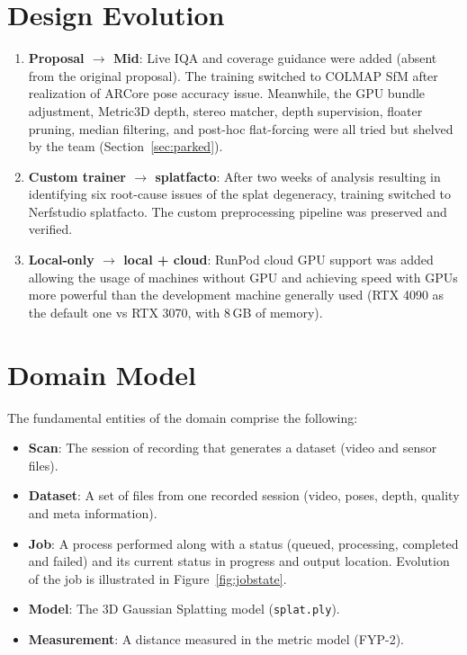 \section{Design Evolution}
\begin{enumerate}
    \item \textbf{Proposal $\rightarrow$ Mid}: Live IQA and coverage guidance were added (absent from the original proposal). The training switched to COLMAP SfM after realization of ARCore pose accuracy issue. Meanwhile, the GPU bundle adjustment, Metric3D depth, stereo matcher, depth supervision, floater pruning, median filtering, and post-hoc flat-forcing were all tried but shelved by the team (Section~\ref{sec:parked}).

    \item \textbf{Custom trainer $\rightarrow$ splatfacto}: After two weeks of analysis resulting in identifying six root-cause issues of the splat degeneracy, training switched to Nerfstudio splatfacto. The custom preprocessing pipeline was preserved and verified.

    \item \textbf{Local-only $\rightarrow$ local + cloud}: RunPod cloud GPU support was added allowing the usage of machines without GPU and achieving speed with GPUs more powerful than the development machine generally used (RTX 4090 as the default one vs RTX 3070, with 8\,GB of memory).
\end{enumerate}

\section{Domain Model}
\label{sec:domain}
The fundamental entities of the domain comprise the following:
\begin{itemize}
    \item \textbf{Scan}: The session of recording that generates a dataset (video and sensor files).
    \item \textbf{Dataset}: A set of files from one recorded session (video, poses, depth, quality and meta information).
    \item \textbf{Job}: A process performed along with a status (queued, processing, completed and failed) and its current status in progress and output location. Evolution of the job is illustrated in Figure~\ref{fig:jobstate}.
    \item \textbf{Model}:  The 3D Gaussian Splatting model (\texttt{splat.ply}).
    \item \textbf{Measurement}: A distance measured in the metric model (FYP-2).
\end{itemize}

